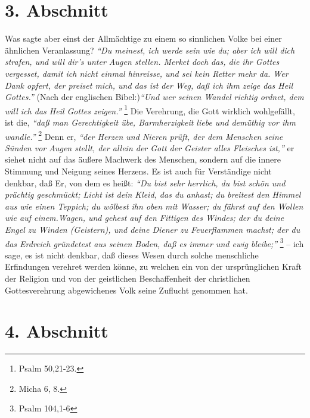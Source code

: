 \section{3. Abschnitt} \label{kap5_ab3}


Was sagte aber einst der Allmächtige  zu einem so
sinnlichen Volke bei einer ähnlichen Veranlassung?
\textit{"`Du meinest, ich werde sein wie du; aber ich will dich
strafen, und will dir’s unter Augen stellen. Merket doch das, die ihr Gottes
vergesset, damit ich nicht einmal hinreisse, und sei kein Retter mehr da. Wer
Dank opfert, der preiset mich, und das ist der Weg, daß ich ihm zeige das Heil
Gottes."'} (Nach der englischen Bibel:)\textit{"`Und wer seinen Wandel richtig
ordnet, dem will ich das Heil Gottes zeigen."'}
\footnote{Psalm 50,21-23.}
Die Verehrung, die Gott wirklich wohlgefällt, ist die, \label{Rechtfertigung} 
\textit{"`daß man Gerechtigkeit übe, Barmherzigkeit liebe und demüthig vor ihm
wandle."'}
\footnote{Micha 6, 8.}
Denn er,
\textit{"`der  Herzen und Nieren prüft, der dem Menschen seine Sünden vor Augen
stellt, der allein der Gott der Geister alles Fleisches ist,"'} er siehet nicht
auf das äußere Machwerk des Menschen, sondern auf die innere Stimmung und
Neigung seines Herzens. Es ist auch für Verständige nicht denkbar, daß Er, von
dem es heißt:
\textit{"`Du bist sehr herrlich, du bist schön und prächtig geschmückt;
Licht ist dein Kleid, das du anhast; du breitest den Himmel aus wie einen
Teppich; du wölbest ihn oben mit Wasser; du fährst auf den Wollen wie auf
einem.Wagen, und gehest auf den Fittigen des Windes; der du deine Engel zu
Winden (Geistern), und deine Diener zu Feuerflammen machst; der du das Erdreich
gründetest aus seinen Boden, daß es immer und ewig bleibe;"'}
\footnote{Psalm 104,1-6}
-- ich sage, es ist nicht denkbar, daß dieses Wesen durch solche
menschliche Erfindungen verehret werden könne, zu welchen ein von der
ursprünglichen Kraft der Religion und von der geistlichen Beschaffenheit der
christlichen Gottesverehrung abgewichenes Volk seine Zuflucht genommen hat.

\section{4. Abschnitt} \label{kap5_ab4}

